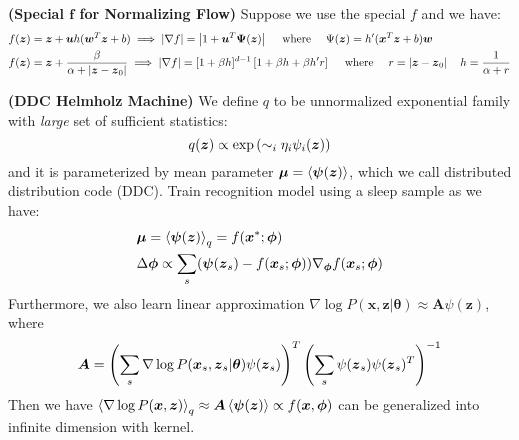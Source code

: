 \begin{remark}{\textbf{(Special $\boldsymbol f$ for Normalizing Flow)}}
    Suppose we use the special $f$ and we have:
    \begin{equation*}
    \begin{aligned}
        &f(\boldsymbol z) = \boldsymbol z + \boldsymbol uh(\boldsymbol w^T\boldsymbol z + b) \implies \left| \nabla f \right| = \left| 1 + \boldsymbol u^T\boldsymbol \Psi(\boldsymbol z) \right| \quad \text{ where } \quad \Psi(\boldsymbol z)=h'(\boldsymbol x^T\boldsymbol z + b)\boldsymbol w \\
        &f(\boldsymbol z) = \boldsymbol z + \frac{\beta}{\alpha + \left| \boldsymbol z - \boldsymbol z_0 \right|} \implies \left| \nabla f \right| = [1 + \beta h]^{d-1}\left[ 1+\beta h + \beta h'r \right] \quad \text{ where }\quad r=\left| \boldsymbol z-\boldsymbol z_0 \right| \quad h = \frac{1}{\alpha + r}
    \end{aligned}
    \end{equation*}
\end{remark}

\begin{definition}{\textbf{(DDC Helmholz Machine)}}
    We define $q$ to be unnormalized exponential family with \emph{large} set of sufficient statistics:
    \begin{equation*}
        q(\boldsymbol z) \propto \exp\left( \sim_i \eta_i\psi_i(\boldsymbol z) \right)
    \end{equation*}
    and it is parameterized by mean parameter $\boldsymbol \mu = \left\langle \boldsymbol \psi(\boldsymbol z) \right\rangle$, which we call distributed distribution code (DDC). Train recognition model using a sleep sample as we have:
    \begin{equation*}
    \begin{aligned}
        &\boldsymbol \mu = \left\langle \boldsymbol \psi(\boldsymbol z) \right\rangle_q = f(\boldsymbol x^* ; \boldsymbol \phi) \\
        &\Delta \boldsymbol \phi \propto \sum_s (\boldsymbol \psi(\boldsymbol z_s) - f(\boldsymbol x_s ; \boldsymbol \phi)) \nabla_{\boldsymbol \phi}f(\boldsymbol x_s ; \boldsymbol \phi)
    \end{aligned}
    \end{equation*}
    Furthermore, we also learn linear approximation $\nabla \log P(\boldsymbol x, \boldsymbol z | \boldsymbol \theta) \approx \boldsymbol A\psi(\boldsymbol z)$, where 
    \begin{equation*}
        \boldsymbol A = \left( \sum_s \nabla \log P(\boldsymbol x_s, \boldsymbol z_s | \boldsymbol \theta)\psi(\boldsymbol z_s) \right)^T\left( \sum_s \psi(\boldsymbol z_s)\psi(\boldsymbol z_s)^T \right)^{-1}
    \end{equation*}
    Then we have $\left\langle \nabla \log P(\boldsymbol x, \boldsymbol z) \right\rangle_q \approx \boldsymbol A\left\langle \boldsymbol \psi(\boldsymbol z) \right\rangle \propto f(\boldsymbol x, \boldsymbol \phi)$ can be generalized into infinite dimension with kernel.
\end{definition}

